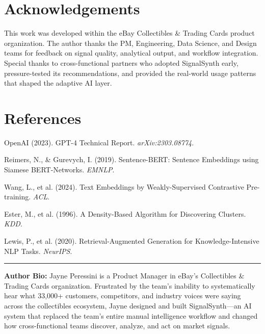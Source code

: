 \documentclass[11pt]{article}
\begin{document}
\section*{Acknowledgements}

This work was developed within the eBay Collectibles \& Trading Cards product organization. The author thanks the PM, Engineering, Data Science, and Design teams for feedback on signal quality, analytical output, and workflow integration. Special thanks to cross-functional partners who adopted SignalSynth early, pressure-tested its recommendations, and provided the real-world usage patterns that shaped the adaptive AI layer.

\section*{References}
\begin{enumerate}[nosep, label={[\arabic*]}]
    \item OpenAI (2023). GPT-4 Technical Report. \textit{arXiv:2303.08774}.
    \item Reimers, N., \& Gurevych, I. (2019). Sentence-BERT: Sentence Embeddings using Siamese BERT-Networks. \textit{EMNLP}.
    \item Wang, L., et al. (2024). Text Embeddings by Weakly-Supervised Contrastive Pre-training. \textit{ACL}.
    \item Ester, M., et al. (1996). A Density-Based Algorithm for Discovering Clusters. \textit{KDD}.
    \item Lewis, P., et al. (2020). Retrieval-Augmented Generation for Knowledge-Intensive NLP Tasks. \textit{NeurIPS}.
\end{enumerate}

\vfill
\noindent\rule{\linewidth}{0.4pt}
\small
\textbf{Author Bio:} Jayne Peressini is a Product Manager in eBay's Collectibles \& Trading Cards organization. Frustrated by the team's inability to systematically hear what 33,000+ customers, competitors, and industry voices were saying across the collectibles ecosystem, Jayne designed and built SignalSynth---an AI system that replaced the team's entire manual intelligence workflow and changed how cross-functional teams discover, analyze, and act on market signals.
\end{document}
